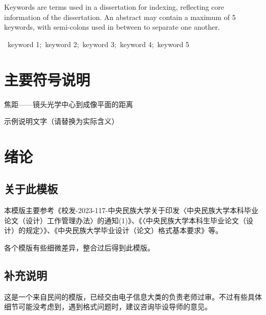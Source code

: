 \documentclass[12pt,a4paper]{ctexart}
\begin{document}
\noindent\hspace{2em}Keywords are terms used in a dissertation for indexing, reflecting core information of the dissertation. An abstract may contain a maximum of 5 keywords, with semi-colons used in between to separate one another.

\vspace{1em}
~keyword 1;~keyword 2;~keyword 3;~keyword 4;~keyword 5

\fontfamily{\familydefault}\selectfont 

\newpage
\setcounter{page}{4} %
\tableofcontents %
\thispagestyle{fancy}

\newpage
\listoffigures
\thispagestyle{fancy}

\newpage
\listoftables
\thispagestyle{fancy}

\newpage
\section*{主要符号说明}
\thispagestyle{fancy}
\begin{description}[leftmargin=4em,itemsep=0.5\baselineskip]
    \item[$f$] 焦距——镜头光学中心到成像平面的距离
    \item[$\delta$] 示例说明文字（请替换为实际含义）
\end{description}

\newpage
\setcounter{page}{1}
\section{绪论}
\subsection{关于此模板}
本模版主要参考《校发-2023-117-中央民族大学关于印发〈中央民族大学本科毕业论文（设计）工作管理办法〉的通知(1)》、《〈中央民族大学本科生毕业论文（设计）的规定〉》、《中央民族大学毕业设计（论文）格式基本要求》等。

各个模版有些细微差异，整合过后得到此模版。

\subsection{补充说明}
这是一个来自民间的模版，已经交由电子信息大类的负责老师过审。不过有些具体细节可能没考虑到，遇到格式问题时，建议咨询毕设导师的意见。
\end{document}
